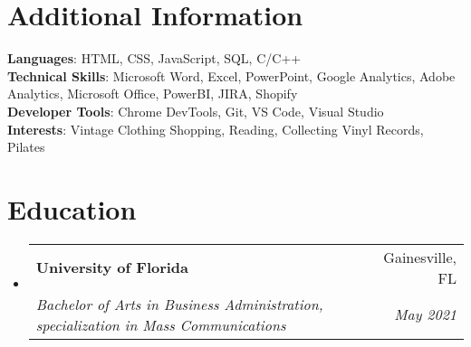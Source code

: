 \documentclass[letterpaper,11pt]{article}
\makeatletter
\newcommand{\resumeSubheading}[4]{
  \vspace{-2pt}\item
    \begin{tabular*}{0.97\textwidth}[t]{l@{\extracolsep{\fill}}r}
      \textbf{#1} & #2 \\
      \textit{\small#3} & \textit{\small #4} \\
    \end{tabular*}\vspace{-7pt}
}
\newcommand{\resumeSubHeadingListStart}{\begin{itemize}[leftmargin=0.15in, label={}]}
\newcommand{\resumeSubHeadingListEnd}{\end{itemize}}
\makeatother
\begin{document}
%
\section{Additional Information}
 \begin{itemize}[leftmargin=0.15in, label={}]
    \small{\item{
     \textbf{Languages}{: HTML, CSS, JavaScript, SQL, C/C++} \\
     \textbf{Technical Skills}{: Microsoft Word, Excel, PowerPoint, Google Analytics, Adobe Analytics, Microsoft Office, PowerBI, JIRA, Shopify} \\
     \textbf{Developer Tools}{: Chrome DevTools, Git, VS Code, Visual Studio} \\
     \textbf{Interests}{: Vintage Clothing Shopping, Reading, Collecting Vinyl Records, Pilates}
    }}
 \end{itemize}

\section{Education}
  \resumeSubHeadingListStart
    \resumeSubheading
      {University of Florida}{Gainesville, FL}
      {Bachelor of Arts in Business Administration, specialization in Mass Communications}{May 2021}
  \resumeSubHeadingListEnd


\end{document}
